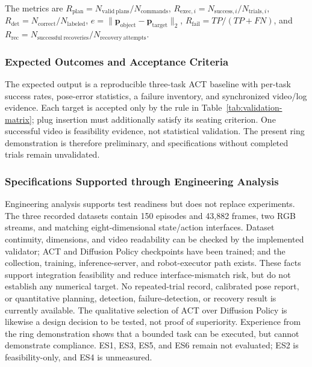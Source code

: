 \documentclass[12pt, letterpaper]{article}
\begin{document}
\noindent The metrics are
$R_{\mathrm{plan}}=N_{\mathrm{valid\ plans}}/N_{\mathrm{commands}}$,
$R_{\mathrm{exec},i}=N_{\mathrm{success},i}/N_{\mathrm{trials},i}$,
$R_{\mathrm{det}}=N_{\mathrm{correct}}/N_{\mathrm{labeled}}$,
$e=\lVert\mathbf{p}_{\mathrm{object}}-\mathbf{p}_{\mathrm{target}}\rVert_2$,
$R_{\mathrm{fail}}=TP/(TP+FN)$, and
$R_{\mathrm{rec}}=N_{\mathrm{successful\ recoveries}}/
N_{\mathrm{recovery\ attempts}}$.

\subsubsection{Expected Outcomes and Acceptance Criteria}

The expected output is a reproducible three-task ACT baseline with per-task
success rates, pose-error statistics, a failure inventory, and synchronized
video/log evidence. Each target is accepted only by the rule in
Table~\ref{tab:validation-matrix}; plug insertion must additionally satisfy its
seating criterion. One successful video is feasibility evidence, not
statistical validation. The present ring demonstration is therefore
preliminary, and specifications without completed trials remain unvalidated.

\subsubsection{Specifications Supported through Engineering Analysis}

Engineering analysis supports test readiness but does not replace experiments.
The three recorded datasets contain 150 episodes and 43,882 frames, two RGB
streams, and matching eight-dimensional state/action interfaces. Dataset
continuity, dimensions, and video readability can be checked by the implemented
validator; ACT and Diffusion Policy checkpoints have been trained; and the
collection, training, inference-server, and robot-executor path exists. These
facts support integration feasibility and reduce interface-mismatch risk, but
do not establish any numerical target. No repeated-trial record, calibrated
pose report, or quantitative planning, detection, failure-detection, or recovery
result is currently available. The qualitative selection of ACT over Diffusion
Policy is likewise a design decision to be tested, not proof of superiority.
Experience from the ring demonstration shows that a bounded task can be
executed, but cannot demonstrate compliance. ES1, ES3, ES5, and ES6 remain not
evaluated; ES2 is feasibility-only, and ES4 is unmeasured.
\end{document}
